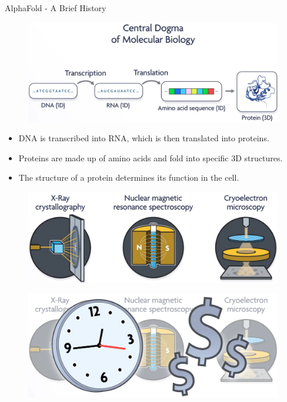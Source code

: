 \begin{frame}[allowframebreaks]{AlphaFold - A Brief History}
    \framebreak

    \begin{figure}
        \centering
        \includegraphics[height=0.6\textheight,width=1\textwidth,keepaspectratio]{images/science/central-dogma.png}
    \end{figure}
    
    \begin{itemize}
        \item DNA is transcribed into RNA, which is then translated into proteins.
        \item Proteins are made up of amino acids and fold into specific 3D structures.
        \item The structure of a protein determines its function in the cell.
    \end{itemize}

    \framebreak

    \begin{figure}
        \centering
        \includegraphics[height=0.6\textheight,width=1\textwidth,keepaspectratio]{images/science/traditional-method.png}
    \end{figure}

    \framebreak

    \begin{figure}
        \centering
        \includegraphics[height=0.6\textheight,width=1\textwidth,keepaspectratio]{images/science/traditional-method-limitation.png}
    \end{figure}
\end{frame}

